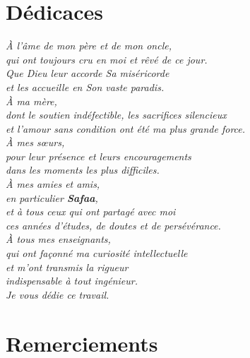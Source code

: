 \chapter*{Dédicaces}
\vspace*{2.5cm}
\begin{flushright}
\itshape\large
À l'âme de mon père et de mon oncle,\\[0.5em]
qui ont toujours cru en moi et rêvé de ce jour.\\
Que Dieu leur accorde Sa miséricorde\\
et les accueille en Son vaste paradis.\\[2em]

À ma mère,\\[0.5em]
dont le soutien indéfectible, les sacrifices silencieux\\
et l'amour sans condition ont été ma plus grande force.\\[2em]

À mes sœurs,\\[0.5em]
pour leur présence et leurs encouragements\\
dans les moments les plus difficiles.\\[2em]

À mes amies et amis,\\[0.5em]
en particulier \textbf{Safaa},\\
et à tous ceux qui ont partagé avec moi\\
ces années d'études, de doutes et de persévérance.\\[2em]

À tous mes enseignants,\\[0.5em]
qui ont façonné ma curiosité intellectuelle\\
et m'ont transmis la rigueur\\
indispensable à tout ingénieur.\\[2em]

\textit{Je vous dédie ce travail.}
\end{flushright}
\vspace*{\fill}
\newpage

\chapter*{Remerciements}

